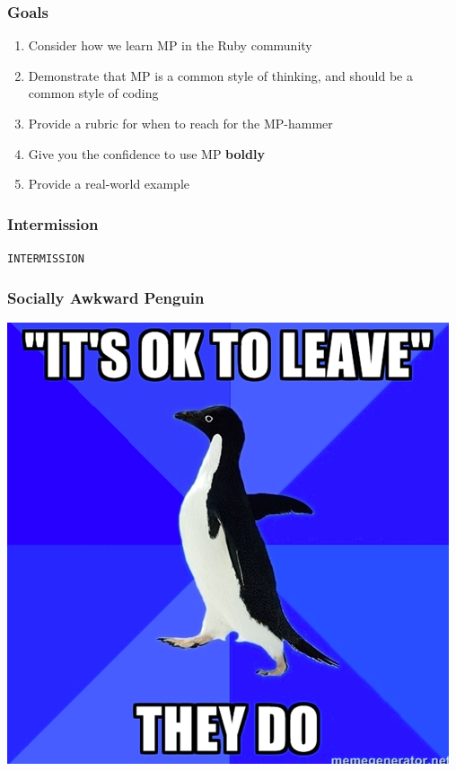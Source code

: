\documentclass[slidestop,compress,mathserif]{beamer}
\begin{document}
\begin{frame}
	\frametitle{Goals}
	\begin{enumerate}
		\item Consider how we learn MP in the Ruby community
		\item Demonstrate that MP is a common style of thinking, and should be a common style of coding
		\item Provide a rubric for when to reach for the MP-hammer
		\item Give you the confidence to use MP \textbf{boldly}
		\item Provide a real-world example
	\end{enumerate}
\end{frame}

\begin{frame}
	\frametitle{Intermission}
	\begin{center}
		\texttt{INTERMISSION}
	\end{center}
\end{frame}

\begin{frame}
	\frametitle{Socially Awkward Penguin}
	\begin{center}
		\includegraphics[scale=0.3]{img/sap.png}			
	\end{center}	
\end{frame}
\end{document}
